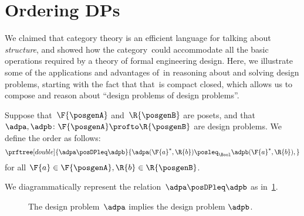 

\section{Ordering DPs}\label{sec:ordering-order}
We claimed that category theory is an efficient language for talking about \emph{structure}, and showed how the category~\DP could accommodate all the basic operations required by a theory of formal engineering design.
Here, we illustrate some of the applications and advantages of~\DP in reasoning about and solving design problems, starting with the fact that that~\DP is compact closed, which allows us to compose and reason about ``design problems of design problems''.


\begin{definition}[Order on~\DP]
    \label{def:DP_loc_pos}
    Suppose that~$\F{\posgenA}$ and~$\R{\posgenB}$ are posets, and that~$\adpa,\adpb \colon \F{\posgenA} \profto \R{\posgenB}$ are design problems.
    We define the order as follows:
    \begin{equation*}
        \prftree[double]{
            \adpa \posDPleq \adpb
        }{
            \adpa(\F{a}^*,\R{b}) \posleq_\Bool \adpb(\F{a}^*,\R{b}),
        }
    \end{equation*}
    for all $\F{a} \in \F{\posgenA},\R{b} \in \R{\posgenB}$.
\end{definition}

We diagrammatically represent the relation~$\adpa \posDPleq \adpb$ as in~\cref{fig:dpimplies}.



\begin{figure}[h!]
    \centering
    \caption{The design problem~$\adpa$ implies the design problem $\adpb$.}
    \label{fig:dpimplies}
\end{figure}

